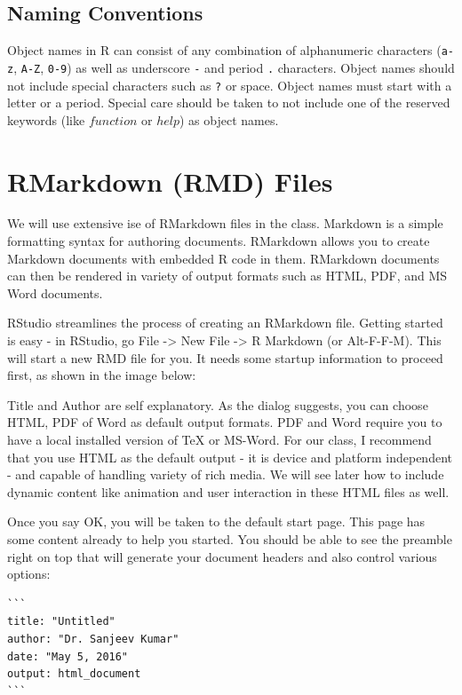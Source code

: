 \documentclass[11pt, letterpaper, twoside]{memoir}\usepackage{knitr}
\begin{document}
\subsection{Naming Conventions}

Object names in R can consist of any combination of alphanumeric characters (\texttt{a-z}, \texttt{A-Z}, \texttt{0-9}) as well as underscore \texttt{-} and period \texttt{.} characters. Object names should not include special characters such as \texttt{?} or space. Object names must start with a letter or a period. Special care should be taken to not include one of the reserved keywords (like $function$ or $help$) as object names.



\section{RMarkdown (RMD) Files}

We will use extensive ise of RMarkdown files in the class. Markdown is a simple formatting syntax for authoring documents. RMarkdown allows you to create Markdown documents with embedded R code in them. RMarkdown documents can then be rendered in variety of output formats such as HTML, PDF, and MS Word documents. 

RStudio streamlines the process of creating an RMarkdown file. Getting started is easy - in RStudio, go File -> New File -> R Markdown (or Alt-F-F-M). This will start a new RMD file for you. It needs some startup information to proceed first, as shown in the image below:


Title and Author are self explanatory. As the dialog suggests, you can choose HTML, PDF of Word as default output formats. PDF and Word require you to have a local installed version of TeX or MS-Word. For our class, I recommend that you use HTML as the default output - it is device and platform independent - and capable of handling variety of rich media. We will see later how to include dynamic content like animation and user interaction in these HTML files as well.

Once you say OK, you will be taken to the default start page. This page has some content already to help you started. You should be able to see the preamble right on top that will generate your document headers and also control various options:

\begin{verbatim}
```
title: "Untitled"
author: "Dr. Sanjeev Kumar"
date: "May 5, 2016"
output: html_document
```
\end{verbatim}
\end{document}

